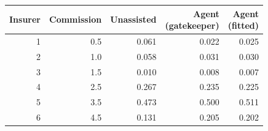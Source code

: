 \begin{tabular}{rrrrr}
\hline\hline
Insurer & Commission & Unassisted & \shortstack{Agent\\(gatekeeper)} & \shortstack{Agent\\(fitted)} \\
\hline
1 & 0.5 & 0.061 & 0.022 & 0.025 \\
2 & 1.0 & 0.058 & 0.031 & 0.030 \\
3 & 1.5 & 0.010 & 0.008 & 0.007 \\
4 & 2.5 & 0.267 & 0.235 & 0.225 \\
5 & 3.5 & 0.473 & 0.500 & 0.511 \\
6 & 4.5 & 0.131 & 0.205 & 0.202 \\
\hline\hline
\end{tabular}
